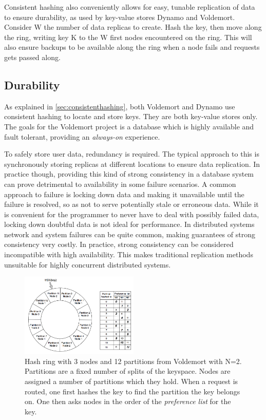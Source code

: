 Consistent hashing also conveniently allows for easy, tunable replication of data to ensure durability, as used by key-value stores Dynamo\cite{dynamo} and Voldemort\cite{voldemort}. Consider W the number of data replicas to create. Hash the key, then move along the ring, writing key K to the W first nodes encountered on the ring. This will also ensure backups to be available along the ring when a node fails and requests gets passed along.

\subsection{Durability}
As explained in \ref{sec:consistenthashing}, both Voldemort and Dynamo use consistent hashing to locate and store keys.
They are both key-value stores only.
The goals for the Voldemort project is a database which is highly available and fault tolerant, providing an \emph{always-on} experience.

To safely store user data, redundancy is required. 
The typical approach to this is synchronously storing replicas at different locations to ensure data replication. 
In practice though, providing this kind of strong consistency in a database system can prove detrimental to availability in some failure scenarios.
A common approach to failure is locking down data and making it unavailable until the failure is resolved, so as not to serve potentially stale or erroneous data.
While it is convenient for the programmer to never have to deal with possibly failed data, locking down doubtful data is not ideal for performance.
In distributed systems network and system failures can be quite common, making guarantees of strong consistency very costly. In practice, strong consistency can be considered incompatible with high availability.
This makes traditional replication methods unsuitable for highly concurrent distributed systems.

\begin{figure}
    \includegraphics[width=0.5\textwidth]{background/figures/hashring_voldemort}
    \caption{Hash ring with 3 nodes and 12 partitions from Voldemort\cite{dynamo} with N=2. Partitions are a fixed number of splits of the keyspace. Nodes are assigned a number of partitions which they hold. When a request is routed, one first hashes the key to find the partition the key belongs on. One then asks nodes in the order of the \emph{preference list} for the key.}
    \label{fig:voldemort_hashring}
\end{figure}

